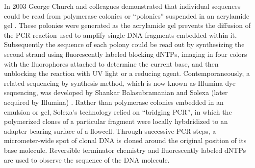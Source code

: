 In 2003 George Church and colleagues demonstrated that individual sequences could be read from polymerase colonies or ``polonies'' suspended in an acrylamide gel \cite{mitra2003fluorescent}.
These polonies were generated as the acrylamide gel prevents the diffusion of the PCR reaction used to amplify single DNA fragments embedded within it.
Subsequently the sequence of each polony could be read out by synthesizing the second strand using fluorescently labeled blocking dNTPs, imaging in four colors with the fluorophores attached to determine the current base, and then unblocking the reaction with UV light or a reducing agent.
Contemporaneously, a related sequencing by synthesis method, which is now known as Illumina dye sequencing, was developed by Shankar Balasubramanian and Solexa (later acquired by Illumina) \cite{balasubramanian2004arrayed, bentley2008accurate}.
Rather than polymerase colonies embedded in an emulsion or gel, Solexa's technology relied on ``bridging PCR'', in which the polymerized clones of a particular fragment were locally hybdridized to an adapter-bearing surface of a flowcell.
Through successive PCR steps, a micrometer-wide spot of clonal DNA is cloned around the original position of its base molecule.
Reversible terminator chemistry \cite{canard1994dna} and fluorescently labeled dNTPs are used to observe the sequence of the DNA molecule.


